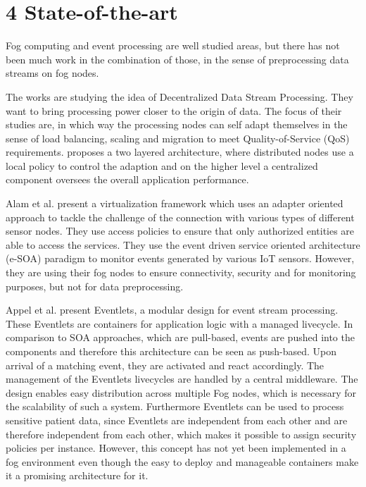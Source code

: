 \documentclass[draft,final,openany,oneside]{vutinfth} %
\begin{document}
\chapter{4  State-of-the-art}

Fog computing and event processing are well studied areas, but there has not been much work in the combination of those, in the sense of preprocessing data streams on fog nodes. 

The works \cite{DSP2018} \cite{DSP2015} are studying the idea of Decentralized Data Stream Processing. They want to bring processing power closer to the origin of data. The focus of their studies are, in which way the processing nodes can self adapt themselves in the sense of load balancing, scaling and migration to meet Quality-of-Service (QoS) requirements. \cite{DSP2018} proposes a two layered architecture, where distributed nodes use a local policy to control the adaption and on the higher level a centralized component oversees the overall application performance.  \newline

Alam et al. \cite{Alam2010} present a virtualization framework which uses an adapter oriented approach to tackle the challenge of the connection with various types of different sensor nodes. They use access policies to ensure that only authorized entities are able to access the services. They use the event driven service oriented architecture (e-SOA) paradigm to monitor events generated by various IoT sensors. However, they are using their fog nodes to ensure connectivity, security and for monitoring purposes, but not for data preprocessing.


Appel et al. \cite{Appel2012} present Eventlets, a modular design for event stream processing. These Eventlets are containers for application logic with a managed livecycle.
In comparison to SOA approaches, which are pull-based, events are pushed into the components and therefore this architecture can be seen as push-based. 
Upon arrival of a matching event, they are activated and react accordingly. The management of the Eventlets livecycles are handled by a central middleware. The design enables easy distribution across multiple Fog nodes, which is necessary for the scalability of such a system.
Furthermore Eventlets can be used to process sensitive patient data, since Eventlets are independent from each other and are therefore independent from each other, which makes it possible to assign security policies per instance. \newline
However, this concept has not yet been implemented in a fog environment even though the easy to deploy and manageable containers make it a promising architecture for it.   
\end{document}
